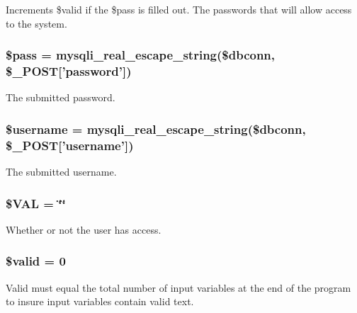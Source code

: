 \-Increments \$valid if the \$pass is filled out. \-The passwords that will allow access to the system. \hypertarget{logVal_8php_a12ec2780b52bd1c54d38c2f981c0349f}{
\subsubsection[{\$pass}]{\setlength{\rightskip}{0pt plus 5cm}\$pass = mysqli\-\_\-real\-\_\-escape\-\_\-string(\$dbconn, \$\-\_\-\-P\-O\-S\-T\mbox{[}'password'\mbox{]})}}\label{logVal_8php_a12ec2780b52bd1c54d38c2f981c0349f}
\-The submitted password. \hypertarget{logVal_8php_a0eb82aa5f81cf845de4b36cd653c42cf}{
\subsubsection[{\$username}]{\setlength{\rightskip}{0pt plus 5cm}\$username = mysqli\-\_\-real\-\_\-escape\-\_\-string(\$dbconn, \$\-\_\-\-P\-O\-S\-T\mbox{[}'username'\mbox{]})}}\label{logVal_8php_a0eb82aa5f81cf845de4b36cd653c42cf}
\-The submitted username. \hypertarget{logVal_8php_afac416adadad464e183a45b802cd7f8a}{
\subsubsection[{\$\-V\-A\-L}]{\setlength{\rightskip}{0pt plus 5cm}\$\-V\-A\-L = \char`\"{}\char`\"{}}}\label{logVal_8php_afac416adadad464e183a45b802cd7f8a}
\-Whether or not the user has access. \hypertarget{logVal_8php_a0587674d27d00ef497e08e53ccf45bbb}{
\subsubsection[{\$valid}]{\setlength{\rightskip}{0pt plus 5cm}\$valid = 0}}\label{logVal_8php_a0587674d27d00ef497e08e53ccf45bbb}
\-Valid must equal the total number of input variables at the end of the program to insure input variables contain valid text. 